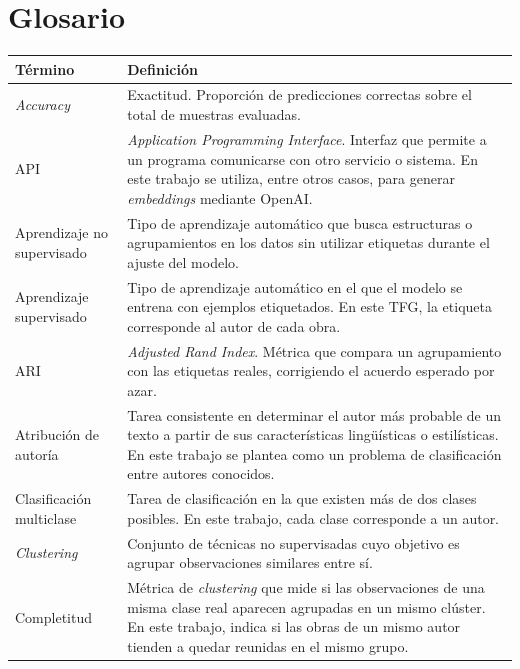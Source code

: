 \documentclass[IB]{TFUOC}%
\begin{document}
\chapter*{Glosario}

\begin{longtable}{|p{5.2cm}|p{10.5cm}|}
\hline
\textbf{Término} & \textbf{Definición} \\
\hline

\textit{Accuracy} &
Exactitud. Proporción de predicciones correctas sobre el total de muestras evaluadas. \\
\hline

API &
\textit{Application Programming Interface}. Interfaz que permite a un programa comunicarse con otro servicio o sistema. En este trabajo se utiliza, entre otros casos, para generar \textit{embeddings} mediante OpenAI. \\
\hline

Aprendizaje no supervisado &
Tipo de aprendizaje automático que busca estructuras o agrupamientos en los datos sin utilizar etiquetas durante el ajuste del modelo. \\
\hline

Aprendizaje supervisado &
Tipo de aprendizaje automático en el que el modelo se entrena con ejemplos etiquetados. En este TFG, la etiqueta corresponde al autor de cada obra. \\
\hline

ARI &
\textit{Adjusted Rand Index}. Métrica que compara un agrupamiento con las etiquetas reales, corrigiendo el acuerdo esperado por azar. \\
\hline

Atribución de autoría &
Tarea consistente en determinar el autor más probable de un texto a partir de sus características lingüísticas o estilísticas. En este trabajo se plantea como un problema de clasificación entre autores conocidos. \\
\hline

Clasificación multiclase &
Tarea de clasificación en la que existen más de dos clases posibles. En este trabajo, cada clase corresponde a un autor. \\
\hline

\textit{Clustering} &
Conjunto de técnicas no supervisadas cuyo objetivo es agrupar observaciones similares entre sí. \\
\hline

Completitud &
Métrica de \textit{clustering} que mide si las observaciones de una misma clase real aparecen agrupadas en un mismo clúster. En este trabajo, indica si las obras de un mismo autor tienden a quedar reunidas en el mismo grupo. \\
\hline


\end{longtable}
\end{document}
